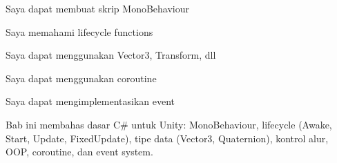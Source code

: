 \documentclass[../main]{subfiles}
\begin{document}
\begin{checklist}
  \item Saya dapat membuat skrip MonoBehaviour
  \item Saya memahami lifecycle functions
  \item Saya dapat menggunakan Vector3, Transform, dll
  \item Saya dapat menggunakan coroutine
  \item Saya dapat mengimplementasikan event
\end{checklist}

\begin{rangkuman}
Bab ini membahas dasar C\# untuk Unity: MonoBehaviour, lifecycle (Awake, Start, Update, FixedUpdate), tipe data (Vector3, Quaternion), kontrol alur, OOP, coroutine, dan event system.
\end{rangkuman}

\ifSubfilesClassLoaded{
  \renewcommand{\bibname}{Daftar Pustaka}
  
  
}{}
\end{document}
